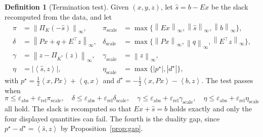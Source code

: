 \documentclass[a4paper,11pt]{book}
\theoremstyle{plain}
\theoremstyle{definition}
\newtheorem{definition}[theorem]{Definition}
\theoremstyle{remark}
\numberwithin{equation}{chapter}
\numberwithin{algorithm}{chapter}
\newcommand{\proj}[2]{\Pi_{#2}\!\left(#1\right)}
\newcommand{\norm}[1]{\left\|#1\right\|}
\newcommand{\inner}[2]{\left\langle #1, #2 \right\rangle}
\begin{document}
	
	\begin{definition}[Termination test]\label{def:term}
		Given $(x,y,z)$, let $\widehat s=b-Ex$ be the slack recomputed from the data,
		and let
		\begin{equation}
			\begin{aligned}
				\pi &= \norm{\proj{-\widehat s}{K}}_\infty,
				& \pi_{\mathrm{scale}} &=
				\max\{\norm{Ex}_\infty,\norm{\widehat s}_\infty,\norm{b}_\infty\},\\
				\delta &= \norm{Px+q+E^\top z}_\infty,
				& \delta_{\mathrm{scale}} &=
				\max\{\norm{Px}_\infty,\norm{q}_\infty,\norm{E^\top z}_\infty\},\\
				\gamma &= \norm{z-\proj{z}{K^*}}_\infty,
				& \gamma_{\mathrm{scale}} &= \norm{z}_\infty,\\
				\eta &= \bigl|\inner{\widehat s}{z}\bigr|,
				& \eta_{\mathrm{scale}} &= \max\{|p^\star|,|d^\star|\},
			\end{aligned}
		\end{equation}
		with $p^\star=\tfrac12\inner{x}{Px}+\inner{q}{x}$ and
		$d^\star=-\tfrac12\inner{x}{Px}-\inner{b}{z}$. The test passes when
		\begin{equation}
			\pi\leq\varepsilon_{\mathrm{abs}}
			+\varepsilon_{\mathrm{rel}}\pi_{\mathrm{scale}},
			\quad
			\delta\leq\varepsilon_{\mathrm{abs}}
			+\varepsilon_{\mathrm{rel}}\delta_{\mathrm{scale}},
			\quad
			\gamma\leq\varepsilon_{\mathrm{abs}}
			+\varepsilon_{\mathrm{rel}}\gamma_{\mathrm{scale}},
			\quad
			\eta\leq\varepsilon_{\mathrm{abs}}
			+\varepsilon_{\mathrm{rel}}\eta_{\mathrm{scale}}
		\end{equation}
		all hold. The slack is recomputed so that $Ex+\widehat s=b$ holds exactly and
		only the four displayed quantities can fail. The fourth is the duality gap,
		since $p^\star-d^\star=\inner{\widehat s}{z}$ by
		Proposition~\ref{prop:gap}.
	\end{definition}
	
\end{document}
